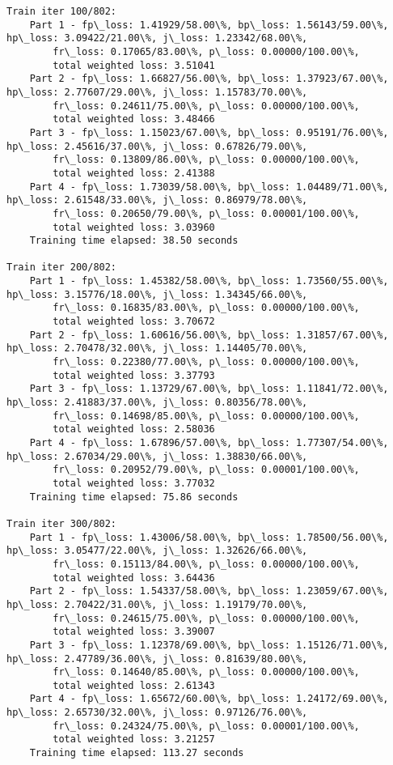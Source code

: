 \documentclass[11pt]{article}
\begin{document}
\begin{Verbatim}[commandchars=\\\{\}]
Train iter 100/802:
	Part 1 - fp\_loss: 1.41929/58.00\%, bp\_loss: 1.56143/59.00\%, hp\_loss: 3.09422/21.00\%, j\_loss: 1.23342/68.00\%, 
		fr\_loss: 0.17065/83.00\%, p\_loss: 0.00000/100.00\%, 
		total weighted loss: 3.51041
	Part 2 - fp\_loss: 1.66827/56.00\%, bp\_loss: 1.37923/67.00\%, hp\_loss: 2.77607/29.00\%, j\_loss: 1.15783/70.00\%, 
		fr\_loss: 0.24611/75.00\%, p\_loss: 0.00000/100.00\%, 
		total weighted loss: 3.48466
	Part 3 - fp\_loss: 1.15023/67.00\%, bp\_loss: 0.95191/76.00\%, hp\_loss: 2.45616/37.00\%, j\_loss: 0.67826/79.00\%, 
		fr\_loss: 0.13809/86.00\%, p\_loss: 0.00000/100.00\%, 
		total weighted loss: 2.41388
	Part 4 - fp\_loss: 1.73039/58.00\%, bp\_loss: 1.04489/71.00\%, hp\_loss: 2.61548/33.00\%, j\_loss: 0.86979/78.00\%, 
		fr\_loss: 0.20650/79.00\%, p\_loss: 0.00001/100.00\%, 
		total weighted loss: 3.03960
	Training time elapsed: 38.50 seconds

Train iter 200/802:
	Part 1 - fp\_loss: 1.45382/58.00\%, bp\_loss: 1.73560/55.00\%, hp\_loss: 3.15776/18.00\%, j\_loss: 1.34345/66.00\%, 
		fr\_loss: 0.16835/83.00\%, p\_loss: 0.00000/100.00\%, 
		total weighted loss: 3.70672
	Part 2 - fp\_loss: 1.60616/56.00\%, bp\_loss: 1.31857/67.00\%, hp\_loss: 2.70478/32.00\%, j\_loss: 1.14405/70.00\%, 
		fr\_loss: 0.22380/77.00\%, p\_loss: 0.00000/100.00\%, 
		total weighted loss: 3.37793
	Part 3 - fp\_loss: 1.13729/67.00\%, bp\_loss: 1.11841/72.00\%, hp\_loss: 2.41883/37.00\%, j\_loss: 0.80356/78.00\%, 
		fr\_loss: 0.14698/85.00\%, p\_loss: 0.00000/100.00\%, 
		total weighted loss: 2.58036
	Part 4 - fp\_loss: 1.67896/57.00\%, bp\_loss: 1.77307/54.00\%, hp\_loss: 2.67034/29.00\%, j\_loss: 1.38830/66.00\%, 
		fr\_loss: 0.20952/79.00\%, p\_loss: 0.00001/100.00\%, 
		total weighted loss: 3.77032
	Training time elapsed: 75.86 seconds

Train iter 300/802:
	Part 1 - fp\_loss: 1.43006/58.00\%, bp\_loss: 1.78500/56.00\%, hp\_loss: 3.05477/22.00\%, j\_loss: 1.32626/66.00\%, 
		fr\_loss: 0.15113/84.00\%, p\_loss: 0.00000/100.00\%, 
		total weighted loss: 3.64436
	Part 2 - fp\_loss: 1.54337/58.00\%, bp\_loss: 1.23059/67.00\%, hp\_loss: 2.70422/31.00\%, j\_loss: 1.19179/70.00\%, 
		fr\_loss: 0.24615/75.00\%, p\_loss: 0.00000/100.00\%, 
		total weighted loss: 3.39007
	Part 3 - fp\_loss: 1.12378/69.00\%, bp\_loss: 1.15126/71.00\%, hp\_loss: 2.47789/36.00\%, j\_loss: 0.81639/80.00\%, 
		fr\_loss: 0.14640/85.00\%, p\_loss: 0.00000/100.00\%, 
		total weighted loss: 2.61343
	Part 4 - fp\_loss: 1.65672/60.00\%, bp\_loss: 1.24172/69.00\%, hp\_loss: 2.65730/32.00\%, j\_loss: 0.97126/76.00\%, 
		fr\_loss: 0.24324/75.00\%, p\_loss: 0.00001/100.00\%, 
		total weighted loss: 3.21257
	Training time elapsed: 113.27 seconds


\end{Verbatim}
\end{document}
